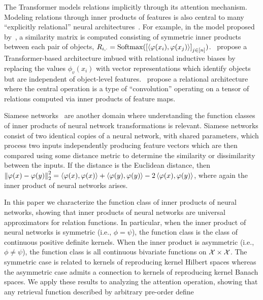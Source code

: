 The Transformer models relations implicitly through its attention mechanism. Modeling relations through inner products of features is also central to many ``explicitly relational'' neural architectures~\parencite[e.g.,][]{webbEmergentSymbols2021,kergNeuralArchitecture2022,altabaaAbstractorsTransformer2023,altabaaRelationalConvolutionalNetworks2023}. For example, in the model proposed by~\cite{kergNeuralArchitecture2022}, a similarity matrix is computed consisting of symmetric inner products between each pair of objects, $R_{i,\cdot} = \mathrm{Softmax}(\left[\left \langle \varphi(x_i), \varphi(x_j) \right\rangle\right]_{j\in[n]})$.~\cite{altabaaAbstractorsTransformer2023} propose a Transformer-based architecture imbued with relational inductive biases by replacing the values $\phi_v(x_i)$ with vector representations which identify objects but are independent of object-level features.~\cite{altabaaRelationalConvolutionalNetworks2023} propose a relational architecture where the central operation is a type of ``convolution'' operating on a tensor of relations computed via inner products of feature maps.

Siamese networks~\parencite{rumelhartLearningRepresentationsBackpropagating1986,langTimedelayNeuralNetwork1988,bromleySignatureVerificationUsing1993,baldiNeuralNetworksFingerprint1993,chopraLearningSimilarityMetric2005,kochSiameseNeuralNetworks2015} are another domain where understanding the function classes of inner products of neural network transformations is relevant. Siamese networks consist of two identical copies of a neural network, with shared parameters, which process two inputs independently producing feature vectors which are then compared using some distance metric to determine the similarity or dissimilarity between the inputs. If the distance is the Euclidean distance, then $\left\lVert\varphi(x) - \varphi(y)\right\rVert_{2}^2 = \left \langle \varphi(x), \varphi(x) \right\rangle + \left \langle \varphi(y), \varphi(y) \right\rangle - 2 \left \langle \varphi(x), \varphi(y) \right\rangle$, where again the inner product of neural networks arises.



In this paper we characterize the function class of inner products of neural networks, showing that inner products of neural networks are universal approximators for relation functions. In particular, when the inner product of neural networks is symmetric (i.e., $\phi=\psi$), the function class is the class of continuous positive definite kernels. When the inner product is asymmetric (i.e., $\phi \neq \psi$), the function class is all continuous bivariate functions on ${\mathcal{X}} \times {\mathcal{X}}$. The symmetric case is related to kernels of reproducing kernel Hilbert spaces whereas the asymmetric case admits a connection to kernels of reproducing kernel Banach spaces. We apply these results to analyzing the attention operation, showing that any retrieval function described by arbitrary pre-order define 